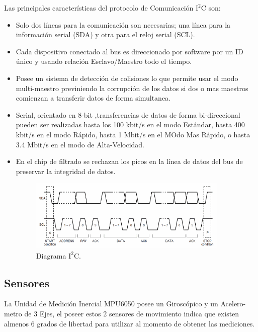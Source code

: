 \documentclass[12pt,a4paper]{article}
\begin{document}
Las principales características del protocolo de Comunicación $\mathrm{I^2C}$ \cite{I2C} son:
\begin{itemize}
\item Solo dos líneas para la comunicación son necesarias; una línea para la información serial (SDA) y otra para el reloj serial (SCL).
\item Cada dispositivo conectado al bus es direccionado por software por un ID único y usando relación Esclavo/Maestro todo el tiempo.
\item Posee un sistema de detección de colisiones lo que permite usar el modo multi-maestro previniendo la corrupción de los datos si dos o mas maestros comienzan a transferir datos de forma simultanea.
\item Serial, orientado en 8-bit ,transferencias de datos de forma bi-direccional pueden ser realizadas hasta los 100 kbit/s en el modo Estándar, hasta 400 kbit/s en el modo Rápido, hasta 1 Mbit/s en el MOdo Mas Rápido, o hasta 3.4 Mbit/s en el modo de Alta-Velocidad.
\item En el chip de filtrado se rechazan los picos en la línea de datos del bus de preservar la integridad de datos.

\begin{figure}[H]
	\centering
  	\includegraphics[width=0.9\textwidth]{images/Diagrama_I2C}
    \caption{Diagrama $\mathrm{I^2C.}$}
	\label{fig:diagramaI2C}
\end{figure}
\end{itemize}
\subsection{Sensores}

La Unidad de Medición Inercial MPU6050\cite{MPU6050} posee un Giroscópico y un Acelero-metro de 3 Ejes, el poseer estos 2 sensores de movimiento indica que existen almenos 6 grados de libertad para utilizar al momento de obtener las mediciones.
\end{document}
